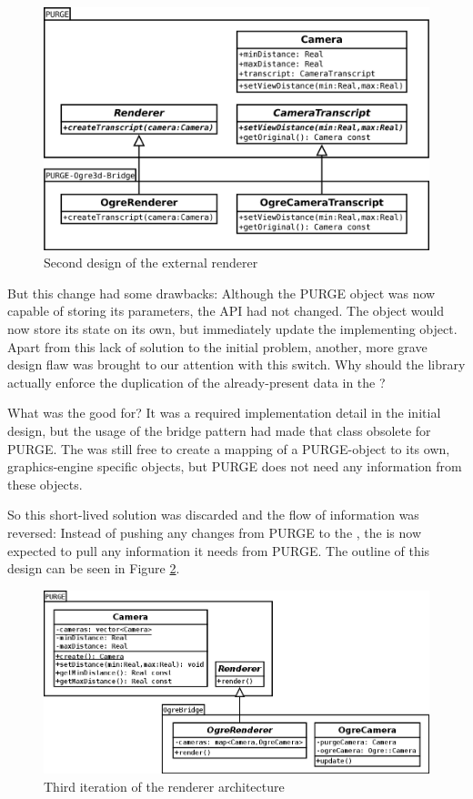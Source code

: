 	\begin{figure}[htbp]
		\centering
		\includegraphics[width=14cm]{images/RendererArchitecture2.png}
		\caption{Second design of the external renderer}
		\label{fig:RendererArchitecture2}
	\end{figure}

	But this change had some drawbacks: Although the PURGE object was now capable of storing its parameters, the API had not changed. The object would now store its state on its own, but immediately update the implementing object. Apart from this lack of solution to the initial problem, another, more grave design flaw was brought to our attention with this switch. Why should the library actually enforce the duplication of the already-present data in the ?
			
	What was the  good for? It was a required implementation detail in the initial design, but the usage of the bridge pattern had made that class obsolete for PURGE. The  was still free to create a mapping of a PURGE-object to its own, graphics-engine specific objects, but PURGE does not need any information from these objects.
	
	So this short-lived solution was discarded and the flow of information was reversed: Instead of pushing any changes from PURGE to the , the  is now expected to pull any information it needs from PURGE. The outline of this design can be seen in Figure \ref{fig:RendererArchitecture3}.

	\begin{figure}[htbp]
		\centering
		\includegraphics[width=14cm]{images/RendererArchitecture3.png}
		\caption{Third iteration of the renderer architecture}
		\label{fig:RendererArchitecture3}
	\end{figure}

